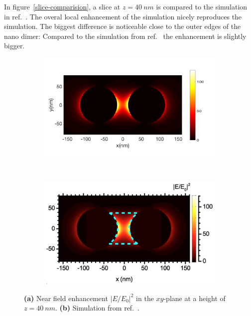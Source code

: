 In figure~\ref{slice-comparision}, a slice at $z=\SI{40}{nm}$ is compared to the simulation in ref.~\cite{heeg}. The overal local enhancement of the simulation nicely reproduces the simulation. The biggest difference is noticeable close to the outer edges of the nano dimer: Compared to the simulation from ref.~\cite{heeg} the enhancement is slightly bigger.

\begin{figure}[!h]
  \centering
  \begin{subfigure}{0.50\textwidth}
    \includegraphics[width=\textwidth]{./images/40nm.png}
  \end{subfigure}
  ~
  \begin{subfigure}{0.40\textwidth}
    \includegraphics[width=\textwidth]{./images/local-enhancement-heeg.png}
  \end{subfigure}
  \caption{\textbf{(a)} Near field enhancement $|E/E_0|^2$ in the $xy$-plane at a height of $z=\SI{40}{nm}$. \textbf{(b)} Simulation from ref.~\cite{heeg}.}
  \label{fig:slice-comparision}
\end{figure}

